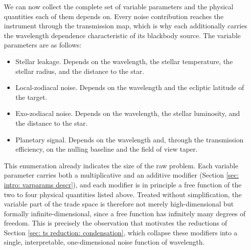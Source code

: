 \documentclass[12pt,a4paper]{article}
\numberwithin{equation}{section}
\numberwithin{figure}{section}
\numberwithin{table}{section}
\begin{document}
We can now collect the complete set of variable parameters and the physical quantities each of them depends on. Every noise contribution reaches the instrument through the transmission map, which is why each additionally carries the wavelength dependence characteristic of its blackbody source. The variable parameters are as follows:
\begin{itemize}
    \item Stellar leakage. Depends on the wavelength, the stellar temperature, the stellar radius, and the distance to the star.
    \item Local-zodiacal noise. Depends on the wavelength and the ecliptic latitude of the target.
    \item Exo-zodiacal noise. Depends on the wavelength, the stellar luminosity, and the distance to the star.
    \item Planetary signal. Depends on the wavelength and, through the transmission efficiency, on the nulling baseline and the field of view taper.
\end{itemize}
This enumeration already indicates the size of the raw problem. Each variable parameter carries both a multiplicative and an additive modifier (Section \ref{sec: intro: varparams descr}), and each modifier is in principle a free function of the two to four physical quantities listed above. Treated without simplification, the variable part of the trade space is therefore not merely high-dimensional but formally infinite-dimensional, since a free function has infinitely many degrees of freedom. This is precisely the observation that motivates the reductions of Section \ref{sec: ts reduction: condensation}, which collapse these modifiers into a single, interpretable, one-dimensional noise function of wavelength.
\end{document}

